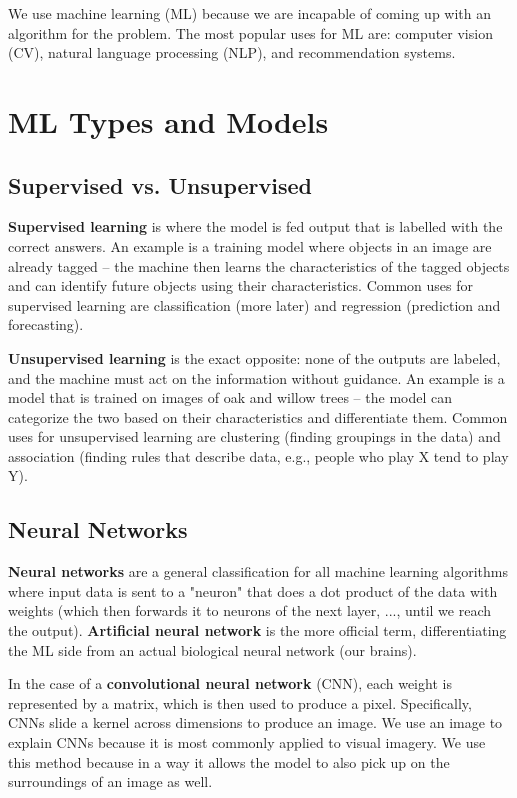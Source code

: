 \documentclass{report}
\newcommand{\npar}{\par\noindent}
\newcommand{\vpar}{\vspace{1em}\npar}
\begin{document}
\par We use machine learning (ML) because we are incapable of coming up with an algorithm for the problem. The most popular uses for ML are: computer vision (CV), natural language processing (NLP), and recommendation systems.

\section{ML Types and Models}

\subsection{Supervised vs. Unsupervised}

\par \textbf{Supervised learning} is where the model is fed output that is labelled with the correct answers. An example is a training model where objects in an image are already tagged -- the machine then learns the characteristics of the tagged objects and can identify future objects using their characteristics. Common uses for supervised learning are classification (more later) and regression (prediction and forecasting).

\vpar \textbf{Unsupervised learning} is the exact opposite: none of the outputs are labeled, and the machine must act on the information without guidance. An example is a model that is trained on images of oak and willow trees -- the model can categorize the two based on their characteristics and differentiate them. Common uses for unsupervised learning are clustering (finding groupings in the data) and association (finding rules that describe data, e.g., people who play X tend to play Y).

\subsection{Neural Networks}

\par \textbf{Neural networks} are a general classification for all machine learning algorithms where input data is sent to a "neuron" that does a dot product of the data with weights (which then forwards it to neurons of the next layer, ..., until we reach the output). \textbf{Artificial neural network} is the more official term, differentiating the ML side from an actual biological neural network (our brains).

\vpar In the case of a \textbf{convolutional neural network} (CNN), each weight is represented by a matrix, which is then used to produce a pixel. Specifically, CNNs slide a kernel across dimensions to produce an image. We use an image to explain CNNs because it is most commonly applied to visual imagery. We use this method because in a way it allows the model to also pick up on the surroundings of an image as well.
\end{document}

